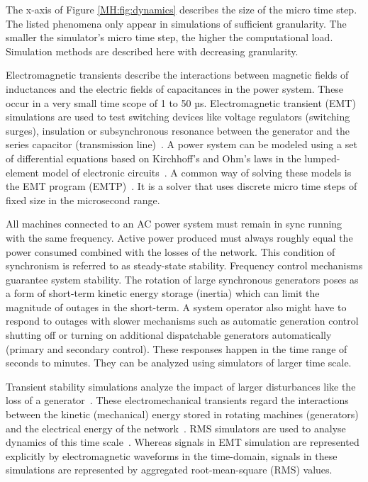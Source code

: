\documentclass[a4paper]{atseminar}
\begin{document}
The x-axis of Figure \ref{MH:fig:dynamics} describes the size of the micro time step. The listed phenomena only appear in simulations of sufficient granularity. The smaller the simulator's micro time step, the higher the computational load. Simulation methods are described here with decreasing granularity.

Electromagnetic transients describe the interactions between magnetic fields of inductances and the electric fields of capacitances in the power system. These occur in a very small time scope of 1 to 50 µs. 
Electromagnetic transient (EMT) simulations are used to test switching devices like voltage regulators (switching surges), insulation or subsynchronous resonance between the generator and the series capacitor (transmission line)~\cite{sauer1998}.
A power system can be modeled using a set of differential equations based on Kirchhoff's and Ohm's laws in the lumped-element model of electronic circuits~\cite{watson2003}.
A common way of solving these models is the EMT program (EMTP)~\cite{dommel1964}. It is a solver that uses discrete micro time steps of fixed size in the microsecond range.

All machines connected to an AC power system must remain in sync running with the same frequency. Active power produced must always roughly equal the power consumed combined with the losses of the network. This condition of synchronism is referred to as steady-state stability. 
Frequency control mechanisms guarantee system stability. The rotation of large synchronous generators poses as a form of short-term kinetic energy storage (inertia) which can limit the magnitude of outages in the short-term. A system operator also might have to respond to outages with slower mechanisms such as automatic generation control shutting off or turning on additional dispatchable generators automatically (primary and secondary control). 
These responses happen in the time range of seconds to minutes. They can be analyzed using simulators of larger time scale. 

Transient stability simulations analyze the impact of larger disturbances like the loss of a generator~\cite{sauer1998}.
These electromechanical transients regard the interactions between the kinetic (mechanical) energy stored in rotating machines (generators) and the electrical energy of the network~\cite{watson2003}.
RMS simulators are used to analyse dynamics of this time scale~\cite{digsilent-rms}.
Whereas signals in EMT simulation are represented explicitly by electromagnetic waveforms in the time-domain, signals in these simulations are represented by aggregated root-mean-square (RMS) values.
\end{document}
